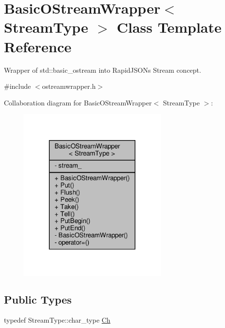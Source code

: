 \hypertarget{classBasicOStreamWrapper}{}\section{Basic\+O\+Stream\+Wrapper$<$ Stream\+Type $>$ Class Template Reference}
\label{classBasicOStreamWrapper}


Wrapper of {\ttfamily std\+::basic\+\_\+ostream} into Rapid\+J\+S\+ON\textquotesingle{}s Stream concept.  




{\ttfamily \#include $<$ostreamwrapper.\+h$>$}



Collaboration diagram for Basic\+O\+Stream\+Wrapper$<$ Stream\+Type $>$\+:
\nopagebreak
\begin{figure}[H]
\begin{center}
\leavevmode
\includegraphics[width=212pt]{classBasicOStreamWrapper__coll__graph}
\end{center}
\end{figure}
\subsection*{Public Types}
\begin{DoxyCompactItemize}
\item 
typedef Stream\+Type\+::char\+\_\+type \hyperlink{classBasicOStreamWrapper_aafc6276f1f5cc0b8d45d137584d380bb}{Ch}
\end{DoxyCompactItemize}
